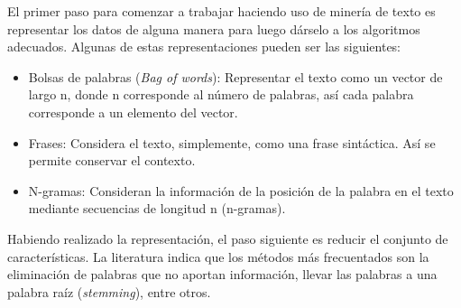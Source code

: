 	El primer paso para comenzar a trabajar haciendo uso de minería de texto es representar los datos de alguna manera para luego dárselo a los algoritmos adecuados. Algunas de estas representaciones pueden ser las siguientes:
	\begin{itemize}
	\item Bolsas de palabras (\textit{Bag of words}): Representar el texto como un vector de largo n, donde n corresponde al número de palabras, así cada palabra corresponde a un elemento del vector.
	\item Frases: Considera el texto, simplemente, como una frase sintáctica. Así se permite conservar el contexto.
	\item N-gramas: Consideran la información de la posición de la palabra en el texto mediante secuencias de longitud n (n-gramas). 
	\end{itemize}

	Habiendo realizado la representación, el paso siguiente es reducir el conjunto de características. La literatura indica que los métodos más frecuentados son la eliminación de palabras que no aportan información, llevar las palabras a una palabra raíz (\textit{stemming}), entre otros.

